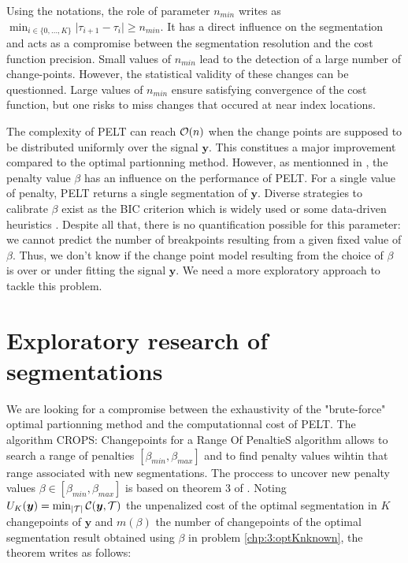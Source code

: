 Using the notations, the role of parameter $n_{min}$ writes as $\min_{i \in \{0,\dots,K\}}\lvert\tau_{i+1}-\tau_{i}\rvert \geq n_{min}$. It has a direct influence on the segmentation and acts as a compromise between the segmentation resolution and the cost function precision. Small values of $n_{min}$ lead to the detection of a large number of change-points. However, the statistical validity of these changes can be questionned. Large values of $n_{min}$ ensure satisfying convergence of the cost function, but one risks to miss changes that occured at near index locations.  
  
The complexity of PELT can reach ${\mathcal O}(n)$ when the change points are supposed to be distributed uniformly over the signal $\bm y$. This constitues a major improvement compared to the optimal partionning method. However, as mentionned in \cite{Haynes2016}, the penalty value $\beta$ has an influence on the performance of PELT. For a single value of penalty, PELT returns a single segmentation of $\bm y$. Diverse strategies to calibrate $\beta$ exist as the BIC criterion which is widely used \cite{YAO1988181,faure2016comparison,Shi2022} or some data-driven heuristics \cite{Birge2006,Baudry2011,Bardet2012,arlot2009data}. Despite all that, there is no quantification possible for this parameter: we cannot predict the number of breakpoints resulting from a given fixed value of $\beta$. Thus, we don't know if the change point model resulting from the choice of $\beta$ is over or under fitting the signal $\bm y$. We need a more exploratory approach to tackle this problem.   

\section{Exploratory research of segmentations}\label{chp:3:3}

We are looking for a compromise between the exhaustivity of the "brute-force" optimal partionning method and the computationnal cost of PELT. The algorithm CROPS: Changepoints for a Range Of PenaltieS algorithm \cite{haynes2017} allows to search a range of penalties $[\beta_{min},\beta_{max}]$ and to find penalty values wihtin that range associated with new segmentations. The proccess to uncover new penalty values $\beta \in [\beta_{min},\beta_{max}]$ is based on theorem 3 of \cite{haynes2017}. Noting $U_K(\bm y) = \min_{\lvert{\mathcal T}\rvert} {\mathcal C}(\bm y,{\mathcal T})$ the unpenalized cost of the optimal segmentation in $K$ changepoints of $\bm y$ and $m(\beta)$ the number of changepoints of the optimal segmentation result obtained using $\beta$ in problem \ref{chp:3:optKnknown}, the theorem writes as follows:


